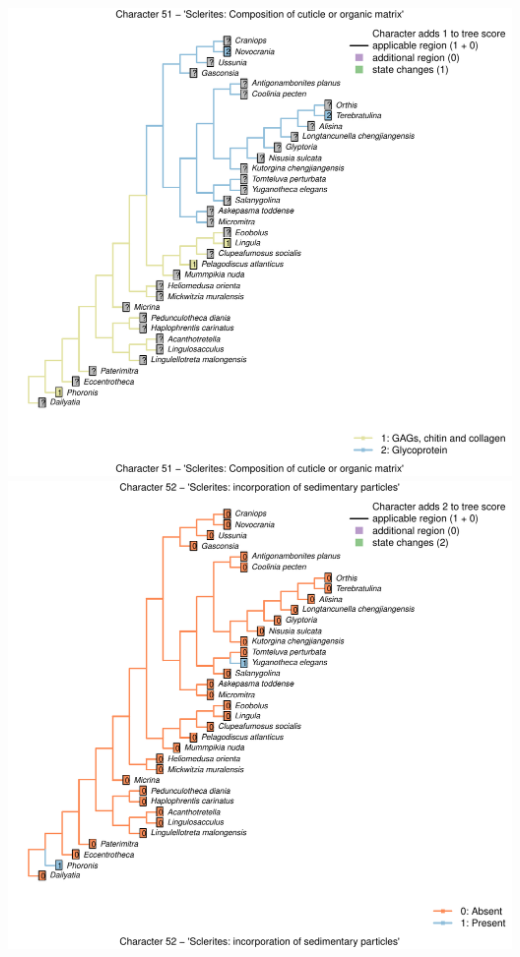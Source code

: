 \documentclass[]{book}
\theoremstyle{definition}
\theoremstyle{definition}
\theoremstyle{definition}
\theoremstyle{remark}
\begin{document}
\includegraphics{Brachiopod_phylogeny_files/figure-latex/unnamed-chunk-4-51.pdf}
\includegraphics{Brachiopod_phylogeny_files/figure-latex/unnamed-chunk-4-52.pdf}
\end{document}
